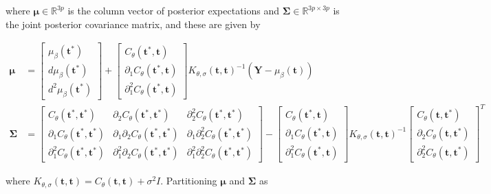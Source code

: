\documentclass[11pt,]{article}
\theoremstyle{nonumberplain}
\begin{document}
where \(\bm{\mu} \in \mathbb{R}^{3p}\) is the column vector of posterior
expectations and \(\bm{\Sigma} \in \mathbb{R}^{3p \times 3p}\) is the
joint posterior covariance matrix, and these are given by

\begin{align*}
  \bm{\mu} &= \begin{bmatrix}\mu_\beta(\mathbf{t}^\ast)\\ d\mu_\beta(\mathbf{t}^\ast)\\ d^2\mu_\beta(\mathbf{t}^\ast)\end{bmatrix} + \begin{bmatrix}C_\theta(\mathbf{t}^\ast, \mathbf{t})\\ \partial_1 C_\theta(\mathbf{t}^\ast, \mathbf{t})\\ \partial_1^2 C_\theta(\mathbf{t}^\ast, \mathbf{t})\end{bmatrix}K_{\theta,\sigma}(\mathbf{t}, \mathbf{t})^{-1} (\mathbf{Y} - \mu_\beta(\mathbf{t}))\\
  \bm{\Sigma} &= \begin{bmatrix}C_\theta(\mathbf{t}^\ast, \mathbf{t}^\ast) & \partial_2 C_\theta(\mathbf{t}^\ast, \mathbf{t}^\ast) & \partial_2^2 C_\theta(\mathbf{t}^\ast, \mathbf{t}^\ast)\\ \partial_1 C_\theta(\mathbf{t}^\ast, \mathbf{t}^\ast) & \partial_1 \partial_2 C_\theta(\mathbf{t}^\ast,\mathbf{t}^\ast) & \partial_1 \partial_2^2 C_\theta(\mathbf{t}^\ast, \mathbf{t}^\ast)\\ \partial_1^2 C_\theta(\mathbf{t}^\ast, \mathbf{t}^\ast) & \partial_1^2 \partial_2 C_\theta(\mathbf{t}^\ast, \mathbf{t}^\ast) & \partial_1^2 \partial_2^2 C_\theta(\mathbf{t}^\ast,\mathbf{t}^\ast)\end{bmatrix} - \begin{bmatrix}C_\theta(\mathbf{t}^\ast, \mathbf{t})\\\partial_1 C_\theta(\mathbf{t}^\ast, \mathbf{t})\\ \partial_1^2 C_\theta(\mathbf{t}^\ast, \mathbf{t})\end{bmatrix}K_{\theta,\sigma}(\mathbf{t}, \mathbf{t})^{-1}\begin{bmatrix}C_\theta(\mathbf{t}, \mathbf{t}^\ast)\\\partial_2 C_\theta(\mathbf{t}, \mathbf{t}^\ast)\\ \partial_2^2 C_\theta(\mathbf{t}, \mathbf{t}^\ast)\end{bmatrix}^T
\end{align*}

where
\(K_{\theta,\sigma}(\mathbf{t}, \mathbf{t}) = C_\theta(\mathbf{t}, \mathbf{t}) + \sigma^2 I\).
Partitioning \(\bm{\mu}\) and \(\bm{\Sigma}\) as
\end{document}
